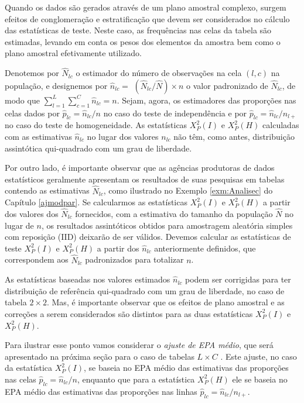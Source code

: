 \documentclass[]{book}
\theoremstyle{definition}
\theoremstyle{definition}
\theoremstyle{definition}
\theoremstyle{remark}
\begin{document}
Quando os dados são gerados através de um plano amostral complexo,
surgem efeitos de conglomeração e estratificação que devem ser
considerados no cálculo das estatísticas de teste. Neste caso, as
frequências nas celas da tabela são estimadas, levando em conta os pesos
dos elementos da amostra bem como o plano amostral efetivamente
utilizado.

Denotemos por \(\hat{N}_{lc}\) o estimador do número de observações na
cela \(\left( l,c\right)\) na população, e designemos por
\(\hat{n}_{lc}=\) \(\left( \hat{N}_{lc}/\hat{N}\right) \times n\) o
valor padronizado de \(\hat{N}_{lc}\), de modo que
\(\sum\limits_{l=1}^{L}\sum\limits_{c=1}^{C}\hat{n}_{lc}=n\). Sejam,
agora, os estimadores das proporções nas celas dados por
\(\hat{p}_{lc}=\hat{n}_{lc}/n\) no caso do teste de independência e por
\(\hat{p}_{lc}=\hat{n}_{lc}/n_{l+}\) no caso do teste de homogeneidade.
As estatísticas \(X_{P}^{2}\left( I\right)\) e
\(X_{P}^{2}\left(H\right)\) calculadas com as estimativas
\(\hat{n}_{lc}\) no lugar dos valores \(n_{lc}\) não têm, como antes,
distribuição assintótica qui-quadrado com um grau de liberdade.

Por outro lado, é importante observar que as agências produtoras de
dados estatísticos geralmente apresentam os resultados de suas pesquisas
em tabelas contendo as estimativas \(\hat{N}_{lc}\), como ilustrado no
Exemplo \ref{exm:Analisec} do Capítulo \ref{ajmodpar}. Se calcularmos as
estatísticas \(X_{P}^{2}\left( I\right)\) e \(X_{P}^{2}\left( H\right)\)
a partir dos valores dos \(\hat{N}_{lc}\) fornecidos, com a estimativa
do tamanho da população \(\hat{N}\) no lugar de \(n\), os resultados
assintóticos obtidos para amostragem aleatória simples com reposição
(IID) deixarão de ser válidos. Devemos calcular as estatísticas de teste
\(X_{P}^{2}\left( I\right)\) e \(X_{P}^{2}\left( H\right)\) a partir dos
\(\hat{n}_{lc}\) anteriormente definidos, que correspondem aos
\(\hat{N}_{lc}\) padronizados para totalizar \(n\).

As estatísticas baseadas nos valores estimados \(\hat{n}_{lc}\) podem
ser corrigidas para ter distribuição de referência qui-quadrado com um
grau de liberdade, no caso de tabela \(2\times 2\). Mas, é importante
observar que os efeitos de plano amostral e as correções a serem
considerados são distintos para as duas estatísticas
\(X_{P}^{2}\left( I\right)\) e \(X_{P}^{2}\left(H\right)\).

Para ilustrar esse ponto vamos considerar o \emph{ajuste de EPA médio},
que será apresentado na próxima seção para o caso de tabelas
\(L\times C\) . Este ajuste, no caso da estatística
\(X_{P}^{2}\left( I\right)\), se baseia no EPA médio das estimativas das
proporções nas celas \(\hat{p}_{lc}=\hat{n}_{lc}/n\), enquanto que para
a estatística \(X_{P}^{2}\left( H\right)\) ele se baseia no EPA médio
das estimativas das proporções nas linhas
\(\hat{p}_{lc}=\hat{n} _{lc}/n_{l+}\).
\end{document}

